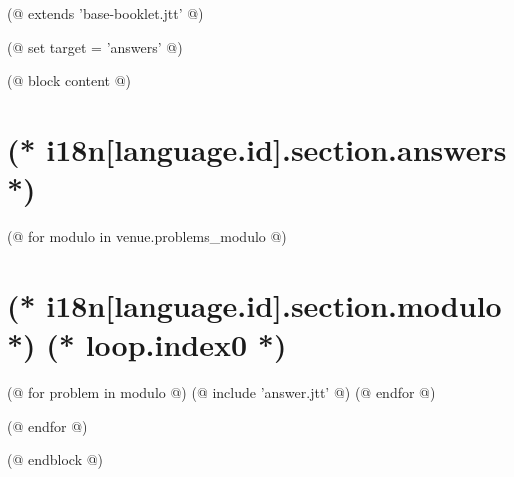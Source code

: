 (@ extends 'base-booklet.jtt' @)

(@ set target = 'answers' @)

(@ block content @)
    \thispagestyle{first}
    \afterpage{\globaldefs=1\restoregeometry}

    \vspace*{19mm}

    \section{(* i18n[language.id].section.answers *)}
    \pagestyle{answers}

    (@ for modulo in venue.problems_modulo @)
        \newpage
        \section{(* i18n[language.id].section.modulo *) (* loop.index0 *)}
        (@ for problem in modulo @)
            (@ include 'answer.jtt' @)
        (@ endfor @)

    (@ endfor @)

(@ endblock @)
